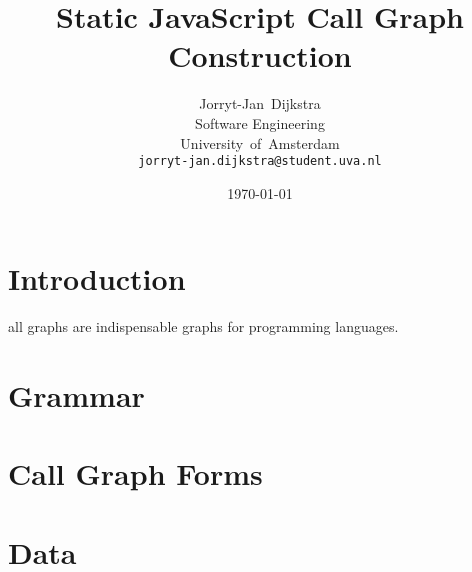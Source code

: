 \documentclass[journal]{IEEEtran}
\begin{document}
\title{Static JavaScript Call Graph Construction}
\author{Jorryt-Jan~Dijkstra \\ Software Engineering \\ University~of~Amsterdam \\ \texttt{jorryt-jan.dijkstra@student.uva.nl}}
\date{\today}

\maketitle


\section{Introduction}
all graphs are indispensable graphs for programming languages.

\section{Grammar}

\section{Call Graph Forms}


\section{Data}



% 
\end{document}
